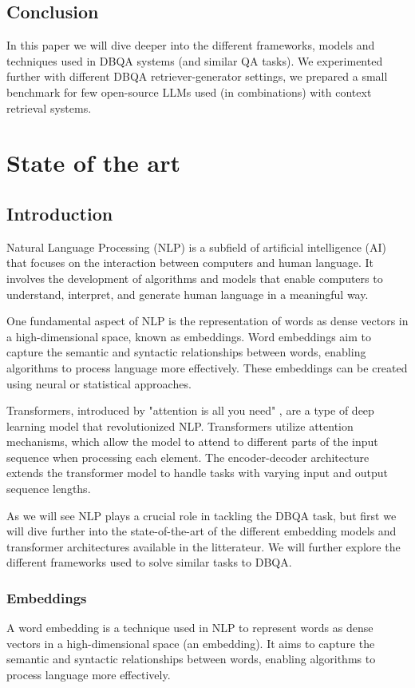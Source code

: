 \documentclass[a4paper,12pt]{article}
\begin{document}
\subsection{Conclusion}
In this paper we will dive deeper into the different frameworks, models and techniques used in DBQA systems (and similar QA tasks). 
We experimented further with different DBQA retriever-generator settings, we prepared a small benchmark for few open-source LLMs used (in combinations) 
with context retrieval systems.

\clearpage
\section{State of the art}

\subsection{Introduction}
Natural Language Processing (NLP) is a subfield of artificial intelligence (AI) that focuses on the interaction between computers and human language. 
It involves the development of algorithms and models that enable computers to understand, interpret, and generate human language in a meaningful way.

One fundamental aspect of NLP is the representation of words as dense vectors in a high-dimensional space, known as embeddings. 
Word embeddings aim to capture the semantic and syntactic relationships between words, enabling algorithms to process language more effectively. 
These embeddings can be created using neural or statistical approaches.

Transformers, introduced by "attention is all you need" \cite{attention}, are a type of deep learning model that revolutionized NLP. 
Transformers utilize attention mechanisms, which allow the model to attend to different parts of the input sequence when processing each element. 
The encoder-decoder architecture extends the transformer model to handle tasks with varying input and output sequence lengths.

As we will see NLP plays a crucial role in tackling the DBQA task, but first we will dive further into the state-of-the-art of the different embedding models 
and transformer architectures available in the litterateur. We will further explore the different frameworks used to solve similar tasks to DBQA.  


\subsubsection{Embeddings}
A word embedding is a technique used in NLP to represent words as dense vectors in a high-dimensional space (an embedding). It aims to capture the semantic and syntactic relationships between words, enabling algorithms to process language more effectively.
\end{document}
